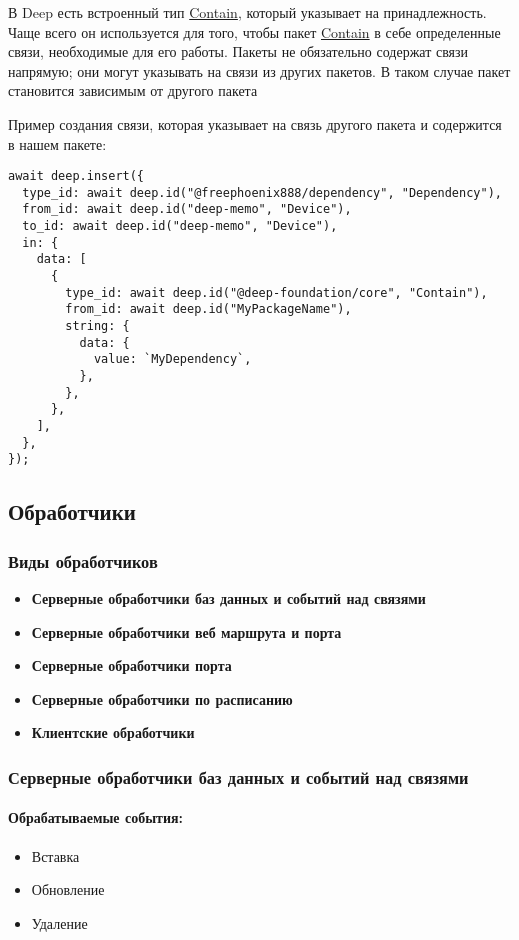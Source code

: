\documentclass{article}
\begin{document}
В Deep есть встроенный тип \hyperlink{Contain.Def}{Contain}, который указывает на
принадлежность. Чаще всего он используется для того, чтобы пакет
\hyperlink{Contain.Def}{Contain} в себе определенные связи, необходимые для его работы.
Пакеты не обязательно содержат связи напрямую; они могут
указывать на связи из других пакетов. В таком случае пакет
становится зависимым от другого пакета

Пример создания связи, которая указывает на связь другого пакета и содержится в
нашем пакете:

\begin{lstlisting}
await deep.insert({
  type_id: await deep.id("@freephoenix888/dependency", "Dependency"),
  from_id: await deep.id("deep-memo", "Device"),
  to_id: await deep.id("deep-memo", "Device"),
  in: {
    data: [
      {
        type_id: await deep.id("@deep-foundation/core", "Contain"),
        from_id: await deep.id("MyPackageName"),
        string: {
          data: {
            value: `MyDependency`,
          },
        },
      },
    ],
  },
});
\end{lstlisting}

\subsection{Обработчики}

\subsubsection{Виды обработчиков}
\begin{itemize}
  \item \textbf{Серверные обработчики баз данных и событий над связями}
  \item \textbf{Серверные обработчики веб маршрута и порта}
  \item \textbf{Серверные обработчики порта}
  \item \textbf{Серверные обработчики по расписанию}
  \item \textbf{Клиентские обработчики}
\end{itemize}

\subsubsection{Серверные обработчики баз данных и событий над связями}
\paragraph{Обрабатываемые события:}
\begin{itemize}
  \item Вставка
  \item Обновление
  \item Удаление
\end{itemize}
\end{document}
